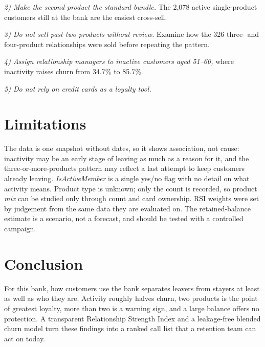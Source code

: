 \documentclass[10pt,twocolumn,letterpaper]{article}
\begin{document}
\textit{2) Make the second product the standard bundle.} The 2,078 active single-product customers still at the bank are the easiest cross-sell.

\textit{3) Do not sell past two products without review.} Examine how the 326 three- and four-product relationships were sold before repeating the pattern.

\textit{4) Assign relationship managers to inactive customers aged 51--60,} where inactivity raises churn from 34.7\% to 85.7\%.

\textit{5) Do not rely on credit cards as a loyalty tool.}

\section{Limitations}
The data is one snapshot without dates, so it shows association, not cause: inactivity may be an early stage of leaving as much as a reason for it, and the three-or-more-products pattern may reflect a last attempt to keep customers already leaving. \textit{IsActiveMember} is a single yes/no flag with no detail on what activity means. Product type is unknown; only the count is recorded, so product \emph{mix} can be studied only through count and card ownership. RSI weights were set by judgement from the same data they are evaluated on. The retained-balance estimate is a scenario, not a forecast, and should be tested with a controlled campaign.

\section{Conclusion}
For this bank, how customers use the bank separates leavers from stayers at least as well as who they are. Activity roughly halves churn, two products is the point of greatest loyalty, more than two is a warning sign, and a large balance offers no protection. A transparent Relationship Strength Index and a leakage-free blended churn model turn these findings into a ranked call list that a retention team can act on today.
\end{document}
